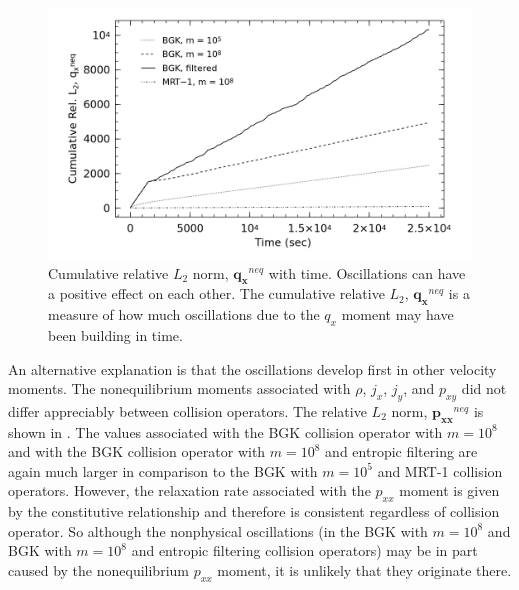 \begin{figure}
    \includegraphics[width=\linewidth]{figs/poise-bingham/qx_cumulative}
    \caption{Cumulative relative $L_2$ norm, $\mathbf{q_x}^{neq}$ with time. Oscillations can have a positive effect on each other. The cumulative relative $L_2$, $\mathbf{q_x}^{neq}$ is a measure of how much oscillations due to the $q_x$ moment may have been building in time.}
    \label{fig:qx-cumulative}
\end{figure}

An alternative explanation is that the oscillations develop first in other velocity moments.
The nonequilibrium moments associated with $\rho$, $j_x$, $j_y$, and $p_{xy}$ did not differ appreciably between collision operators.
The relative $L_2$ norm, $\mathbf{p_{xx}}^{neq}$ is shown in .
The values associated with the BGK collision operator with $m = 10^8$ and with the BGK collision operator with $m = 10^8$ and entropic filtering are again much larger in comparison to the BGK with $m = 10^5$ and MRT-1 collision operators.
However, the relaxation rate associated with the $p_{xx}$ moment is given by the constitutive relationship and therefore is consistent regardless of collision operator.
So although the nonphysical oscillations (in the BGK with $m = 10^8$ and BGK with $m = 10^8$ and entropic filtering collision operators) may be in part caused by the nonequilibrium $p_{xx}$ moment, it is unlikely that they originate there.

